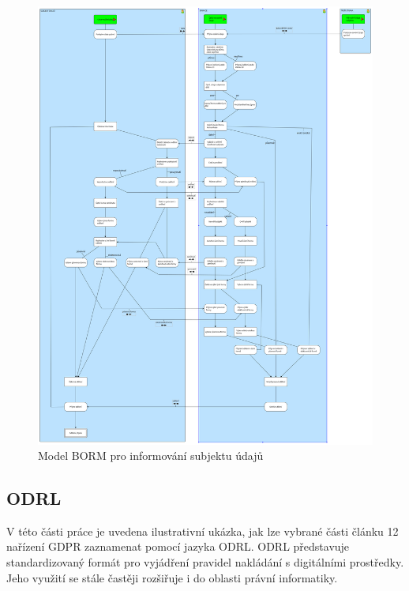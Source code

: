 \begin{itemize}
  \begin{figure}[H]
    \centering
    \includegraphics[width=\textwidth]{images/BORM_informace.png}
    \caption{Model BORM pro informování subjektu údajů}
    \label{fig:borm_informace}
  \end{figure}
    
\end{itemize}


\subsection{ODRL}
\label{sec:odrl}
V této části práce je uvedena ilustrativní ukázka, jak lze vybrané části článku 12 nařízení GDPR zaznamenat pomocí jazyka ODRL. ODRL představuje standardizovaný formát pro vyjádření pravidel nakládání s digitálními prostředky. Jeho využití se stále častěji rozšiřuje i do oblasti právní informatiky.

